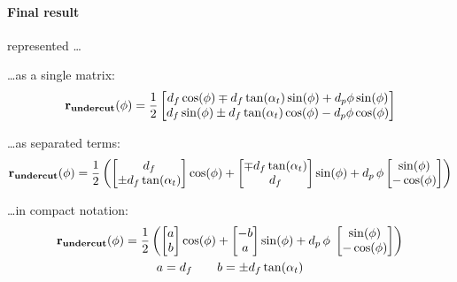 \paragraph{Final result} represented \dots

\dots as a single matrix:
\begin{equation}
\vb{r_{undercut}}(\phi) = \frac{1}{2}
        \begin{bmatrix}
            d_f\cos(\phi) \mp d_f\tan(\alpha_t)\sin(\phi) + d_p\phi\sin(\phi) \\
            d_f\sin(\phi) \pm d_f\tan(\alpha_t)\cos(\phi) - d_p\phi\cos(\phi) \\
        \end{bmatrix}
\label{eq:undercut_single_matrix}
\end{equation}

\dots as separated terms:
\begin{equation}
\vb{r_{undercut}}(\phi) = \frac{1}{2}\left(
            \begin{bmatrix}
                d_f\\
                \pm d_f\tan(\alpha_t)\\
            \end{bmatrix}
        \cos(\phi)
        +
            \begin{bmatrix}
                \mp d_f\tan(\alpha_t) \\
                d_f \\
            \end{bmatrix}
        \sin(\phi)
        + d_p\,\phi
            \begin{bmatrix}
                \sin(\phi) \\
                - \cos(\phi) \\
            \end{bmatrix}
        \right)
\label{eq:undercut_separated_terms}
\end{equation}

\dots in compact notation:
\begin{equation}
\begin{gathered}
    \vb{r_{undercut}}(\phi) = \frac{1}{2} \left(
        \begin{bmatrix}
            a \\ b
        \end{bmatrix} \cos(\phi)
        + \begin{bmatrix}
            -b \\ a
        \end{bmatrix} \sin(\phi)
        + d_p\,\phi\; \begin{bmatrix}
            \sin(\phi) \\ - \cos(\phi)
        \end{bmatrix}
        \right)
\\
    a = d_f \quad\quad b = \pm d_f\tan(\alpha_t)
\label{eq:undercut_compact_notation}
\end{gathered}
\end{equation}


